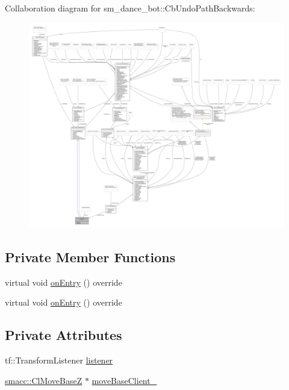 Collaboration diagram for sm\+\_\+dance\+\_\+bot\+:\+:Cb\+Undo\+Path\+Backwards\+:
\nopagebreak
\begin{figure}[H]
\begin{center}
\leavevmode
\includegraphics[width=350pt]{classsm__dance__bot_1_1CbUndoPathBackwards__coll__graph}
\end{center}
\end{figure}
\subsection*{Private Member Functions}
\begin{DoxyCompactItemize}
\item 
virtual void \hyperlink{classsm__dance__bot_1_1CbUndoPathBackwards_a5ecdf83df96ab3d74eb4e4febea7fa74}{on\+Entry} () override
\item 
virtual void \hyperlink{classsm__dance__bot_1_1CbUndoPathBackwards_a5ecdf83df96ab3d74eb4e4febea7fa74}{on\+Entry} () override
\end{DoxyCompactItemize}
\subsection*{Private Attributes}
\begin{DoxyCompactItemize}
\item 
tf\+::\+Transform\+Listener \hyperlink{classsm__dance__bot_1_1CbUndoPathBackwards_a35aa53997f49c33d11a43cca81a72dfd}{listener}
\item 
\hyperlink{classsmacc_1_1ClMoveBaseZ}{smacc\+::\+Cl\+Move\+BaseZ} $\ast$ \hyperlink{classsm__dance__bot_1_1CbUndoPathBackwards_a2e134a879373ea9d29d04f72f707cbc8}{move\+Base\+Client\+\_\+}
\end{DoxyCompactItemize}
